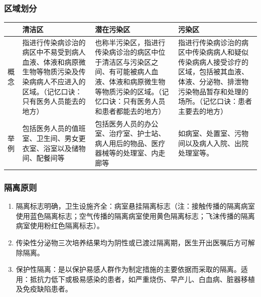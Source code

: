 \documentclass[11pt, a4paper]{ctexart}
\begin{document}
\subsubsection{区域划分}
\begin{table}[htbp]
	\centering
	\begin{tabular}{|p{2.5cm}|p{4cm}|p{4cm}|p{4cm}|}
		\hline
		   & \textbf{清洁区}                                                       & \textbf{潜在污染区}                                                                  & \textbf{污染区}                                                                   \\
		\hline
		概念 & 指进行传染病诊治的病区中不易受到病人血液、体液和病原微生物等物质污染及传染病病人不应进入的区域。（记忆口诀：只有医务人员能去的地方） & 也称半污染区，指进行传染病诊治的病区中位于清洁区与污染区之间、有可能被病人血液、体液和病原微生物等物质污染的区域。（记忆口诀：只有医务人员和患者都能去的地方） & 指进行传染病诊治的病区中传染病病人和疑似传染病病人接受诊疗的区域，包括被其血液、体液、分泌物、排泄物污染物品暂存和处理的场所。（记忆口诀：患者主要去的地方） \\
		\hline
		举例 & 包括医务人员的值班室、卫生间、男女更衣室、浴室以及储物间、配餐间等                                  & 包括医务人员的办公室、治疗室、护士站、病人用后的物品、医疗器械等的处理室、内走廊等                                       & 如病室、处置室、污物间以及病人入院、出院处理室等。                                                      \\
		\hline
	\end{tabular}
\end{table}

\subsubsection{隔离原则}
\begin{enumerate}
	\item 隔离标志明确，卫生设施齐全：病室悬挂隔离标志（注：接触传播的隔离病室使用蓝色隔离标志；空气传播的隔离病室使用黄色隔离标志；飞沫传播的隔离病室使用粉红色隔离标志）。
	\item 传染性分泌物三次培养结果均为阴性或已渡过隔离期，医生开出医嘱后方可解除隔离。
	\item 保护性隔离：是以保护易感人群作为制定措施的主要依据而采取的隔离。适用：抵抗力低下或极易感染的患者，如严重烧伤、早产儿、白血病、脏器移植及免疫缺陷患者。
\end{enumerate}
\end{document}
